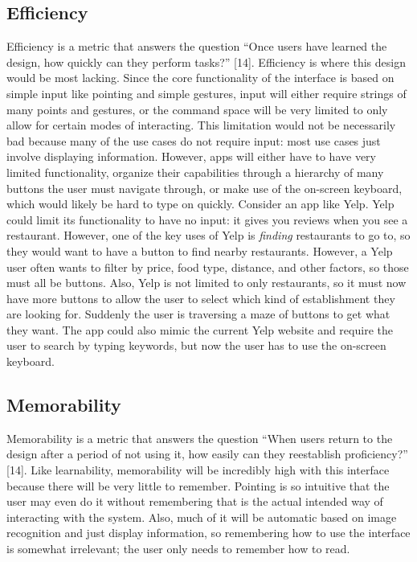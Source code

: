 \documentclass[a4paper,12pt]{article}
\begin{document}
\subsection{Efficiency}

Efficiency is a metric that answers the question ``Once users have learned the design, how quickly can they perform tasks?'' [14]. Efficiency is where this design would be most lacking. Since the core functionality of the interface is based on simple input like pointing and simple gestures, input will either require strings of many points and gestures, or the command space will be very limited to only allow for certain modes of interacting. This limitation would not be necessarily bad because many of the use cases do not require input: most use cases just involve displaying information. However, apps will either have to have very limited functionality, organize their capabilities through a hierarchy of many buttons the user must navigate through, or make use of the on-screen keyboard, which would likely be hard to type on quickly. Consider an app like Yelp. Yelp could limit its functionality to have no input: it gives you reviews when you see a restaurant. However, one of the key uses of Yelp is \emph{finding} restaurants to go to, so they would want to have a button to find nearby restaurants. However, a Yelp user often wants to filter by price, food type, distance, and other factors, so those must all be buttons. Also, Yelp is not limited to only restaurants, so it must now have more buttons to allow the user to select which kind of establishment they are looking for. Suddenly the user is traversing a maze of buttons to get what they want. The app could also mimic the current Yelp website and require the user to search by typing keywords, but now the user has to use the on-screen keyboard.

\subsection{Memorability}

Memorability is a metric that answers the question ``When users return to the design after a period of not using it, how easily can they reestablish proficiency?'' [14]. Like learnability, memorability will be incredibly high with this interface because there will be very little to remember. Pointing is so intuitive that the user may even do it without remembering that is the actual intended way of interacting with the system. Also, much of it will be automatic based on image recognition and just display information, so remembering how to use the interface is somewhat irrelevant; the user only needs to remember how to read.
\end{document}
